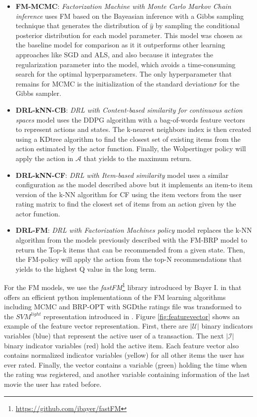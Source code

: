 \begin{itemize}
\item \textbf{FM-MCMC}: \textit{Factorization Machine with Monte Carlo Markov Chain inference}  uses FM based on the Bayeasian inference with a Gibbs sampling technique that generates the distribution of $\hat{y}$ by sampling the conditional posterior distribution for each model parameter. This model was chosen as the baseline model for comparison as it it outperforms other learning approaches like SGD and ALS, and also because it integrates the regularization parameter into the model, which avoids a time-consuming search for the optimal hyperparameters. The only hyperparameter that remains for MCMC is the initialization of the standard deviation$\sigma$ for the Gibbs sampler.
\item \textbf{DRL-kNN-CB}: \textit{DRL with Content-based similarity for continuous action spaces} model uses the DDPG algorithm with a bag-of-words feature vectors to represent actions and states. The k-nearest neighbors index is then created using a KDtree algorithm \cite{friedman1977algorithm} to find the closest set of existing items from the action estimated by the actor function. Finally, the Wolpertinger policy will apply the action in $\mathcal{A}$ that yields to the maximum return.
\item \textbf{DRL-kNN-CF}: \textit{DRL with Item-based similarity} model uses a similar configuration as the model described above but it implements an item-to item version of the k-NN algorithm for CF using the item vectors from the user rating matrix to find the closest set of items from an action given by the actor function.
\item \textbf{DRL-FM}: \textit{DRL with Factorization Machines policy} model replaces the k-NN algorithm from the models previously described with the FM-BRP model to return the Top-k items that can be recommended from a given state. Then, the FM-policy will apply the action from the top-N recommendations that yields to the highest Q value in the long term.
\end{itemize}

For the FM models, we use the \textit{fastFM}\footnote{\url{https://github.com/ibayer/fastFM}} library introduced by Bayer I. in \cite{bayer2015fastfm} that offers an efficient python implementationn of the FM learning algorithms including MCMC and BRP-OPT with SGDthe ratings file was transformed to the $SVM^{light}$ representation introduced in \cite{joachims1999making}. Figure \ref{fig:featurevector} shows an example of the feature vector representation. First, there are $|\mathcal{U}|$ binary indicators variables (blue) that represent the active user of a transaction. The next $|\mathcal{I}|$ binary indicator variables (red) hold the active item. Each feature vector also contains normalized indicator variables (yellow) for all other items the user has ever rated. Finally, the vector contains a variable (green) holding the time when the rating was registered, and another variable containing information of the last movie the user has rated before.

